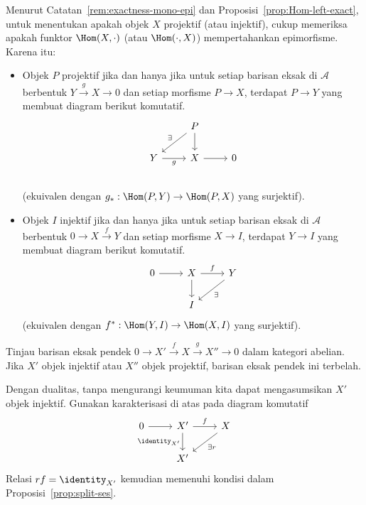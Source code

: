 Menurut Catatan~\ref{rem:exactness-mono-epi} dan
Proposisi~\ref{prop:Hom-left-exact}, untuk menentukan apakah objek $X$ projektif
(atau injektif), cukup memeriksa apakah funktor $\Hom(X,\cdot)$ (atau
$\Hom(\cdot,X)$) mempertahankan epimorfisme. Karena itu:
\begin{itemize}
	\item Objek $P$ projektif jika dan hanya jika untuk setiap barisan eksak
	di $\mathcal{A}$ berbentuk $Y\xrightarrow{g}X\to0$ dan setiap morfisme
	$P\to X$, terdapat $P\to Y$ yang membuat diagram berikut komutatif.
	\[\begin{tikzcd}
		& P \arrow[d] \arrow[ld, "\exists"'] & \\
	Y \arrow[r, "g"'] & X \arrow[r] & 0 \\
	\end{tikzcd}\]
	(ekuivalen dengan $g_*:\Hom(P,Y)\to\Hom(P,X)$ yang surjektif).
	\item Objek $I$ injektif jika dan hanya jika untuk setiap barisan eksak
	di $\mathcal{A}$ berbentuk $0\to X\xrightarrow{f}Y$ dan setiap morfisme
	$X\to I$, terdapat $Y\to I$ yang membuat diagram berikut komutatif.
	\[\begin{tikzcd}
		0 \arrow[r] & X \arrow[r, "f"] \arrow[d] & Y \arrow[ld, "\exists"] \\
		& I &
	\end{tikzcd}\]
	(ekuivalen dengan $f^*:\Hom(Y,I)\to\Hom(X,I)$ yang surjektif).
\end{itemize}

\begin{lema}\label{prop:inj-proj-split}
Tinjau barisan eksak pendek
$0\to X'\xrightarrow{f}X\xrightarrow{g}X''\to0$ dalam kategori abelian.
Jika $X'$ objek injektif atau $X''$ objek projektif, barisan eksak pendek ini terbelah.
\end{lema}

\begin{bukti}
Dengan dualitas, tanpa mengurangi keumuman kita dapat mengasumsikan $X'$ objek
injektif. Gunakan karakterisasi di atas pada diagram komutatif
\[\begin{tikzcd}
	0 \arrow[r] & X' \arrow[r, "f"] \arrow[d, "{\identity_{X'}}"'] & X \arrow[ld, "\exists r"] \\
	& X' &
\end{tikzcd}\]
Relasi $rf=\identity_{X'}$ kemudian memenuhi kondisi dalam
Proposisi~\ref{prop:split-ses}.
\end{bukti}

